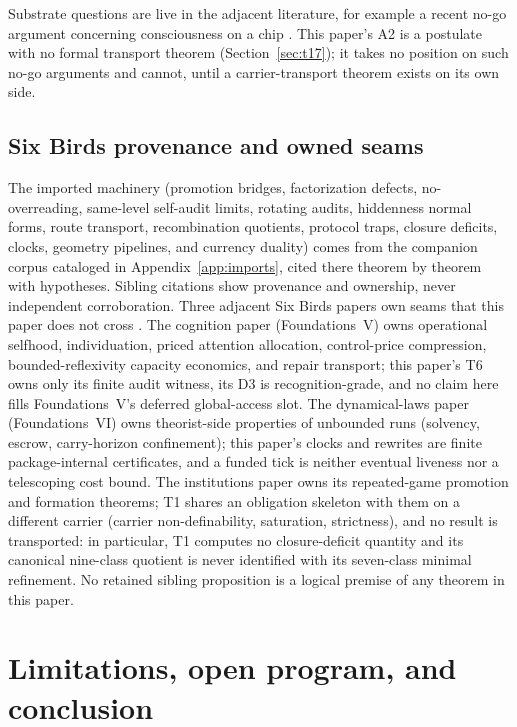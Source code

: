 \documentclass[11pt]{article}
\theoremstyle{definition}
\begin{document}
Substrate questions are live in the adjacent literature, for example a
recent no-go argument concerning consciousness on a chip
\citep{KleinerLudwig2024Neurons}. This paper's A2 is a postulate with no
formal transport theorem (Section~\ref{sec:t17}); it takes no position on
such no-go arguments and cannot, until a carrier-transport theorem exists on
its own side.

\subsection{Six Birds provenance and owned seams}

The imported machinery (promotion bridges, factorization defects,
no-overreading, same-level self-audit limits, rotating audits, hiddenness
normal forms, route transport, recombination quotients, protocol traps,
closure deficits, clocks, geometry pipelines, and currency duality) comes from
the companion corpus cataloged in Appendix~\ref{app:imports}, cited there
theorem by theorem with hypotheses. Sibling citations show provenance and
ownership, never independent corroboration. Three adjacent Six Birds papers
own seams that this paper does not cross
\citep{Tsiokos2026FoundationsVEndogenousClosure,
Tsiokos2026FoundationsVIDynamicalLaws,
Tsiokos2026InstitutionsStrictExtensions}. The cognition paper (Foundations~V)
owns operational selfhood, individuation, priced attention allocation,
control-price compression, bounded-reflexivity capacity economics, and repair
transport; this paper's T6 owns only its finite audit witness, its D3 is
recognition-grade, and no claim here fills Foundations~V's deferred
global-access slot. The dynamical-laws paper (Foundations~VI) owns
theorist-side properties of unbounded runs (solvency, escrow, carry-horizon
confinement); this paper's clocks and rewrites are finite package-internal
certificates, and a funded tick is neither eventual liveness nor a
telescoping cost bound. The institutions paper owns its repeated-game
promotion and formation theorems; T1 shares an obligation skeleton with them
on a different carrier (carrier non-definability, saturation, strictness),
and no result is transported: in particular, T1 computes no
closure-deficit quantity and its canonical nine-class quotient is never
identified with its seven-class minimal refinement. No retained sibling
proposition is a logical premise of any theorem in this paper.

 \section{Limitations, open program, and conclusion}
\label{sec:limits}
\end{document}
